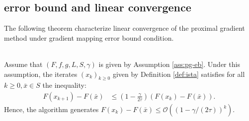 \documentclass[12pt]{article}
\begin{document}
    \subsection{error bound and linear convergence}
        The following theorem characterize linear convergence of the proximal gradient method under gradient mapping error bound condition. 
        \begin{theorem}\;\label{thm:lin-cnvg-ista-eb}\\
            Assume that $(F, f, g, L, S, \gamma)$ is given by Assumption \ref{ass:pg-eb}. 
            Under this assumption, the iterates $(x_k)_{k \ge 0}$ given by Definition \ref{def:ista} satisfies for all $k \ge 0, \bar x \in S$ the inequality: 
            \begin{align*}
                F(x_{k + 1}) - F(\bar x)
                &\le 
                \left(
                    1 - \frac{\gamma}{2\tau}
                \right)(F(x_k) - F(\bar x)). 
            \end{align*}
            Hence, the algorithm generates $F(x_k) - F(\bar x)\le \mathcal O((1 - \gamma/(2\tau))^k)$. 
        \end{theorem}
\end{document}
